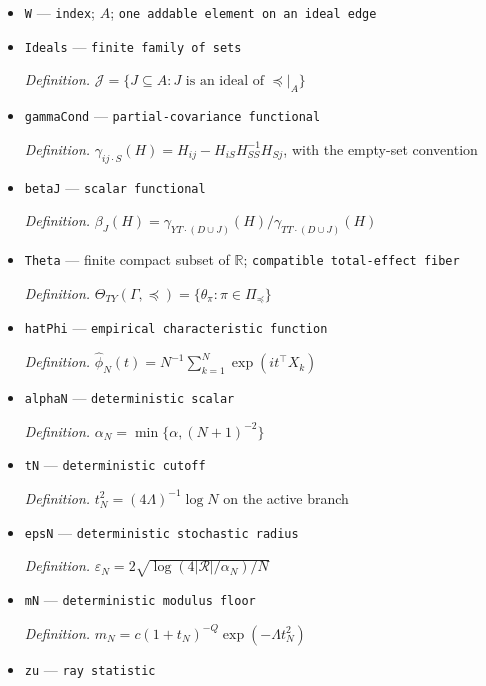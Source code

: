 \documentclass{article}
\begin{document}
\begin{itemize}
  \par\smallskip\noindent\emph{Definition.} \(A=V\setminus(D\cup\{T\}\cup\{v\in V:T\prec v\})\)
  \item \texttt{W} --- \texttt{index}; \(A\); \texttt{one addable element on an ideal edge}
  \item \texttt{Ideals} --- \texttt{finite family of sets}
  \par\smallskip\noindent\emph{Definition.} \(\mathcal J=\{J\subseteq A:J\text{ is an ideal of }\preceq|_A\}\)
  \item \texttt{gammaCond} --- \texttt{partial-\allowbreak{}covariance functional}
  \par\smallskip\noindent\emph{Definition.} \(\gamma_{ij\cdot S}(H)=H_{ij}-H_{iS}H_{SS}^{-1}H_{Sj}\), with the empty-set convention
  \item \texttt{betaJ} --- \texttt{scalar functional}
  \par\smallskip\noindent\emph{Definition.} \(\beta_J(H)=\gamma_{YT\cdot(D\cup J)}(H)/\gamma_{TT\cdot(D\cup J)}(H)\)
  \item \texttt{Theta} --- finite compact subset of \(\mathbb R\); \texttt{compatible total-\allowbreak{}effect fiber}
  \par\smallskip\noindent\emph{Definition.} \(\Theta_{TY}(\Gamma,\preceq)=\{\theta_\pi:\pi\in\Pi_{\preceq}\}\)
  \item \texttt{hatPhi} --- \texttt{empirical characteristic function}
  \par\smallskip\noindent\emph{Definition.} \(\widehat\phi_N(t)=N^{-1}\sum_{k=1}^N\exp(i t^\top X_k)\)
  \item \texttt{alphaN} --- \texttt{deterministic scalar}
  \par\smallskip\noindent\emph{Definition.} \(\alpha_N=\min\{\alpha,(N+1)^{-2}\}\)
  \item \texttt{tN} --- \texttt{deterministic cutoff}
  \par\smallskip\noindent\emph{Definition.} \(t_N^2=(4\Lambda)^{-1}\log N\) on the active branch
  \item \texttt{epsN} --- \texttt{deterministic stochastic radius}
  \par\smallskip\noindent\emph{Definition.} \(\varepsilon_N=2\sqrt{\log(4|\mathcal R|/\alpha_N)/N}\)
  \item \texttt{mN} --- \texttt{deterministic modulus floor}
  \par\smallskip\noindent\emph{Definition.} \(m_N=c(1+t_N)^{-Q}\exp(-\Lambda t_N^2)\)
  \item \texttt{zu} --- \texttt{ray statistic}

\end{itemize}
\end{document}
